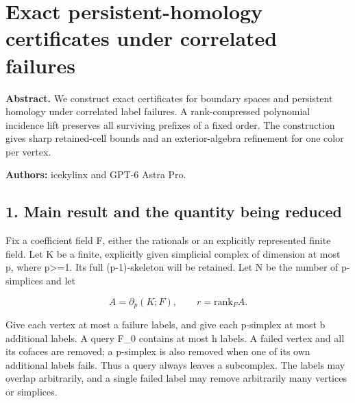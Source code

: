 
\hypertarget{af-3f6acd6e5b-exact-persistent-homology-certificates-under-correlated-failures}{%
\section{Exact persistent-homology certificates under correlated failures}\label{af-3f6acd6e5b-exact-persistent-homology-certificates-under-correlated-failures}}

\textbf{Abstract.} We construct exact certificates for boundary spaces and persistent homology under correlated label failures. A rank-compressed polynomial incidence lift preserves all surviving prefixes of a fixed order. The construction gives sharp retained-cell bounds and an exterior-algebra refinement for one color per vertex.

\textbf{Authors:} icekylinx and GPT-6 Astra Pro.

\hypertarget{af-3f6acd6e5b-main-result-and-the-quantity-being-reduced}{%
\subsection{1. Main result and the quantity being reduced}\label{af-3f6acd6e5b-main-result-and-the-quantity-being-reduced}}

Fix a coefficient field F, either the rationals or an explicitly represented finite field. Let K be a finite, explicitly given simplicial complex of dimension at most p, where p\textgreater=1. Its full (p-1)-skeleton will be retained. Let N be the number of p-simplices and let

\[
A=\partial_p(K;F),\qquad r=\mathrm{rank}_F A.
 \tag{T1}
\]

Give each vertex at most a failure labels, and give each p-simplex at most b additional labels. A query F\_0 contains at most h labels. A failed vertex and all its cofaces are removed; a p-simplex is also removed when one of its own additional labels fails. Thus a query always leaves a subcomplex. The labels may overlap arbitrarily, and a single failed label may remove arbitrarily many vertices or simplices.

